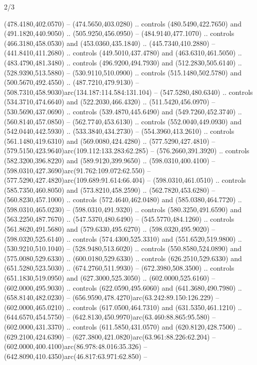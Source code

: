 \begin{flagdescription}{2/3}
\begin{scope}[xshift=0.5\flaglength,yshift=0.5\flagwidth,scale=\flagwidth/638.38]
\begin{scope}[y=0.80pt, x=0.80pt, yscale=-1,shift={(-600,-400)}]
\begin{scope}[shift={(-0.02,2.173)}]
  (478.4180,402.0570) -- (474.5650,403.0280) .. controls (480.5490,422.7650) and
  (491.1820,440.9050) .. (505.9250,456.0950) -- (484.9140,477.1070) .. controls
  (466.3180,458.0530) and (453.0360,435.1840) .. (445.7340,410.2880) --
  (441.8410,411.2680) .. controls (449.5010,437.4780) and (463.6310,461.5050) ..
  (483.4790,481.3480) .. controls (496.9200,494.7930) and (512.2830,505.6140) ..
  (528.9390,513.5880) -- (530.9110,510.0900) .. controls (515.1480,502.5780) and
  (500.5670,492.4550) .. (487.7210,479.9130) --
  (508.7310,458.9030)arc(134.187:114.584:131.104) -- (547.5280,480.6340) ..
  controls (534.3710,474.6640) and (522.2030,466.4320) .. (511.5420,456.0970) --
  (530.5690,437.0690) .. controls (539.4870,445.6490) and (549.7260,452.3740) ..
  (560.8140,457.0850) -- (562.7740,453.6130) .. controls (552.0040,449.0930) and
  (542.0440,442.5930) .. (533.3840,434.2730) -- (554.3960,413.2610) .. controls
  (561.1480,419.6310) and (569.0080,424.4280) .. (577.5290,427.4810) --
  (579.5150,423.9640)arc(109.112:133.283:62.285) -- (576.2660,391.3920) ..
  controls (582.3200,396.8220) and (589.9120,399.9650) .. (598.0310,400.4100) --
  (598.0310,427.3690)arc(91.762:109.072:62.550) --
  (577.5290,427.4820)arc(109.689:91.614:66.404) -- (598.0310,461.0510) ..
  controls (585.7350,460.8050) and (573.8210,458.2590) .. (562.7820,453.6280) --
  (560.8230,457.1000) .. controls (572.4640,462.0480) and (585.0380,464.7720) ..
  (598.0310,465.0230) -- (598.0310,491.9320) .. controls (580.3250,491.6590) and
  (563.2250,487.7670) .. (547.5370,480.6490) -- (545.5770,484.1260) .. controls
  (561.8620,491.5680) and (579.6330,495.6270) .. (598.0320,495.9020) --
  (598.0320,525.6140) .. controls (574.4300,525.3310) and (551.6520,519.9800) ..
  (530.9210,510.1040) -- (528.9480,513.6020) .. controls (550.8580,524.0890) and
  (575.0080,529.6330) .. (600.0180,529.6330) .. controls (626.2510,529.6330) and
  (651.5280,523.5030) .. (674.2760,511.9930) -- (672.3980,508.3500) .. controls
  (651.1830,519.0950) and (627.3000,525.3050) .. (602.0000,525.6160) --
  (602.0000,495.9030) .. controls (622.0590,495.6060) and (641.3680,490.7980) ..
  (658.8140,482.0230) -- (656.9590,478.4270)arc(63.242:89.150:126.229) --
  (602.0000,465.0210) .. controls (617.0500,464.7310) and (631.5350,461.1210) ..
  (644.6570,454.5750) -- (642.8130,450.9970)arc(63.460:88.865:95.580) --
  (602.0000,431.3370) .. controls (611.5850,431.0570) and (620.8120,428.7500) ..
  (629.2100,424.6390) -- (627.3800,421.0820)arc(63.961:88.226:62.204) --
  (602.0000,400.4100)arc(86.978:48.016:35.326) --
  (642.8090,410.4350)arc(46.817:63.971:62.850) --

\end{scope}
\end{scope}
\end{scope}
\end{flagdescription}
